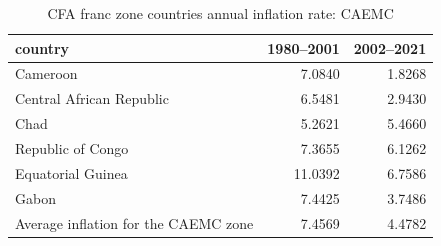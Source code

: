 \begin{table}

\caption{CFA franc zone countries annual inflation rate: CAEMC}
\centering
\begin{tabular}[t]{lrr}
\toprule
country & 1980--2001 & 2002--2021\\
\midrule
Cameroon & 7.0840 & 1.8268\\
Central African Republic & 6.5481 & 2.9430\\
Chad & 5.2621 & 5.4660\\
Republic of Congo & 7.3655 & 6.1262\\
Equatorial Guinea & 11.0392 & 6.7586\\
\addlinespace
Gabon & 7.4425 & 3.7486\\
Average inflation for the CAEMC zone & 7.4569 & 4.4782\\
\bottomrule
\end{tabular}
\end{table}